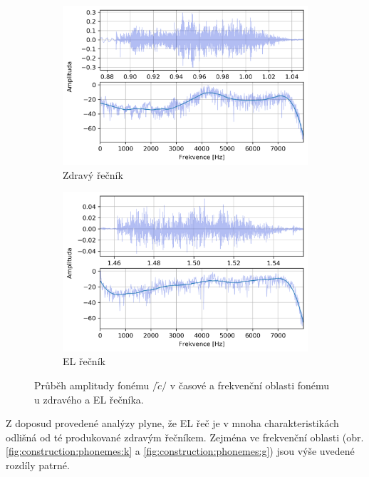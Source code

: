 \begin{figure}[htpb]
  \centering
  \begin{subfigure}[b]{0.45\textwidth}
    \includegraphics[width=\textwidth]{./ch5-construction/img/signal-normal_c.png}
    \caption{Zdravý řečník}
    \label{fig:construction:phonemes:c:normal}
  \end{subfigure}
  \begin{subfigure}[b]{0.45\textwidth}
    \includegraphics[width=\textwidth]{./ch5-construction/img/signal-el_c.png}
    \caption{EL řečník}
    \label{fig:construction:phonemes:c:el}
  \end{subfigure}
  \caption[Průběh amplitudy fonému $/\check{c}/$ zdravého a EL řečníka.]{Průběh amplitudy fonému $/\check{c}/$ v časové a frekvenční oblasti fonému u zdravého a EL řečníka.}
  \label{fig:construction:phonemes:c}
\end{figure}

Z doposud provedené analýzy plyne, že EL řeč je v mnoha charakteristikách odlišná od té produkované zdravým řečníkem.
Zejména ve frekvenční oblasti (obr. \ref{fig:construction:phonemes:k} a \ref{fig:construction:phonemes:g}) jsou výše uvedené rozdíly patrné.

